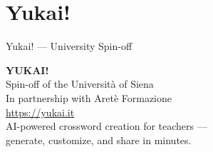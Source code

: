 \section[From Research to Product: Yukai!]{Yukai!}

\begin{frame}{Yukai! --- University Spin-off}
  \begin{center}
    \vspace{1em}
    {\Large\color{unisired}\textbf{YUKAI!}}\\[0.5em]
    {\normalsize Spin-off of the Universit\`a of Siena}\\[0.6em]
    {\small\color{graytext} In partnership with Aret\`e Formazione}\\[0.4em]
    {\scriptsize\color{graytext} \url{https://yukai.it}}\\[1.5em]
    {\small AI-powered crossword creation for teachers ---\\[0.3em]
    generate, customize, and share in minutes.}
  \end{center}
\end{frame}

